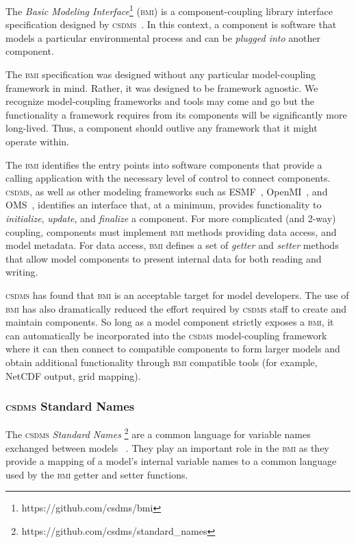 \documentclass[11pt, oneside]{amsart}
\DeclareRobustCommand{\csdms}{\textsc{csdms}}
\DeclareRobustCommand{\bmi}{\textsc{bmi}}
\begin{document}
The \emph{Basic Modeling Interface}\footnote{https://github.com/csdms/bmi}
(\bmi{}) is a component-coupling library
interface specification designed by \csdms~\cite{peckham2012component,
syvitski2014plug}.  In this context, a component is software that models a
particular environmental process and can be \emph{plugged into} another
component.

The \bmi{} specification was designed without any particular model-coupling
framework in mind.  Rather, it was designed to be framework agnostic. We
recognize model-coupling frameworks and tools may come and go but the
functionality a framework requires from its components will be significantly
more long-lived. Thus, a component should outlive any framework that it might
operate within.

The \bmi{} identifies the entry points into software components that provide a
calling application with the necessary level of control to connect components.
\csdms{}, as well as other modeling frameworks such as
ESMF~\cite{hill2004architecture}, OpenMI~\cite{gregersen2007openmi}, and
OMS~\cite{david2002object}, identifies an interface that, at a minimum,
provides functionality to \emph{initialize}, \emph{update}, and
\emph{finalize} a component. For more complicated (and 2-way)
coupling, components must implement \bmi{} methods providing data access,
and model metadata. For data access, \bmi{} defines a set of \emph{getter}
and \emph{setter} methods that allow model components to present internal data
for both reading and writing.

\csdms{} has found that \bmi{} is an acceptable target for model developers.
The use of \bmi{} has also dramatically reduced the effort required by
\csdms{} staff to create and maintain components. So long as a model component
strictly exposes a \bmi{}, it can automatically be incorporated into the
\csdms{} model-coupling framework where it can then connect to compatible
components to form larger models and obtain additional functionality through
\bmi{} compatible tools (for example, NetCDF output, grid mapping).

\subsubsection{\csdms{} Standard Names}
\label{sec:standardnames}

The \csdms{} \emph{Standard Names}
\footnote{https://github.com/csdms/standard\_names}
are a common language for variable names exchanged between models
~\cite{peckham2014csdms}. They play
an important role in the \bmi{} as they provide a mapping of a model's
internal variable names to a common language used by the \bmi{} getter and
setter functions.
\end{document}
